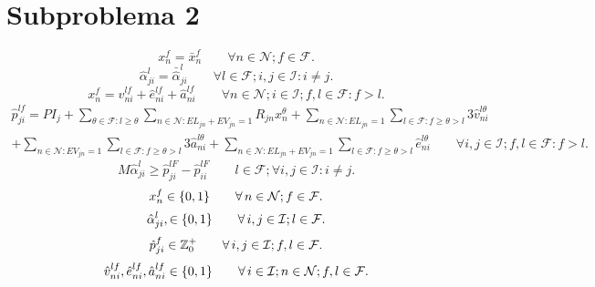 \documentclass[authoryear,preprint,review,12pts]{elsarticle}
\begin{document}
\section{Subproblema 2}
\begin{equation}\label{x_sp2}
x_n^f= \bar{x}_n^f \qquad \forall n \in \mathcal{N}; f \in \mathcal{F}.
\end{equation}
\begin{equation}\label{alpha-sp2}
\hat{\alpha}_{ji}^l = \bar{\hat{\alpha}}_{ji}^l \qquad \forall l \in \mathcal{F}; i,j \in \mathcal{I}: i \neq j.
\end{equation}
\begin{equation}\label{ecua8}
  x_n^f = \hat{v}_{ni}^{lf} + \hat{e}_{ni}^{lf} + \hat{a}_{ni}^{lf} \qquad \forall n \in \mathcal{N}; i \in \mathcal{I}; f,l \in \mathcal{F}: f > l.
\end{equation}
\begin{multline}\label{ecua10}
  \hat{p}_{ji}^{lf} = PI_j + \sum_{\theta \in  \mathcal{F}: l \geq \theta}\sum\limits_{n \in \mathcal{N}: EL_{jn}+EV_{jn}=1}R_{jn}x_n^\theta + \sum\limits_{n \in \mathcal{N}: EL_{jn}=1}\sum\limits_{l \in \mathcal{F}: f \geq \theta > l}3\hat{v}_{ni}^{l\theta} \\
  + \sum\limits_{n \in \mathcal{N}: EV_{jn}=1}\sum\limits_{l \in \mathcal{F}: f \geq \theta > l}3\hat{a}_{ni}^{l\theta} + \sum\limits_{n \in \mathcal{N}: EL_{jn}+ EV_{jn}=1}\sum\limits_{l \in \mathcal{F}: f \geq \theta > l}\hat{e}_{ni}^{l\theta} \qquad \forall i,j \in \mathcal{I}; f,l \in \mathcal{F}: f > l.
\end{multline}
\begin{equation}\label{ecua12a}
   M \hat{\alpha}_{ji}^l \geq \hat{p}_{ji}^{lF} - \hat{p}_{ii}^{lF} \qquad l \in \mathcal{F}; \forall i,j \in \mathcal{I}: i \neq j.
\end{equation}
\begin{equation}\label{ecua29_sp2}
  x_n^f \in\{0,1\} \qquad \forall\, n \in \mathcal{N}; f \in \mathcal{F}.\\
\end{equation}
\begin{equation}\label{ecua33_sp2}
  \hat{\alpha}_{ji}^l, \in \{0,1\} \qquad \forall\, i,j \in \mathcal{I}; l \in \mathcal{F}.\\
\end{equation}
\begin{equation}\label{ecua31_sp2}
  \hat{p}_{ji}^{f} \in \mathbb{Z}^+_0 \qquad \forall\, i,j \in \mathcal{I}; f,l \in \mathcal{F}.\\
\end{equation}
\begin{equation}\label{ecua32a}
  \hat{v}_{ni}^{lf},  \hat{e}_{ni}^{lf}, \hat{a}_{ni}^{lf} \in \{0,1\} \qquad \forall\, i \in \mathcal{I}; n \in \mathcal{N}; f,l \in \mathcal{F}.\\
\end{equation}
\end{document}
